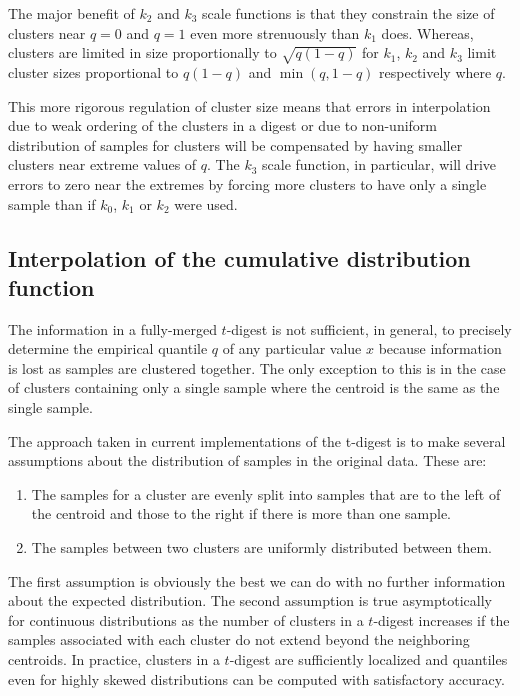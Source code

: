 \documentclass[11pt]{amsart}
\begin{document}
The major benefit of $k_2$ and $k_3$ scale functions is that they constrain the size of clusters near $q=0$ and $q=1$ even more strenuously than $k_1$ does. Whereas, clusters are limited in size proportionally to $\sqrt {q (1-q)}$ for $k_1$, $k_2$ and $k_3$ limit cluster sizes proportional to $q(1-q)$ and $\min(q,1-q)$ respectively where $q$.

This more rigorous regulation of cluster size means that errors in interpolation due to weak ordering of the clusters in a digest or due to non-uniform distribution of samples for clusters will be compensated by having smaller clusters near extreme values of $q$. The $k_3$ scale function, in particular, will drive errors to zero near the extremes by forcing more clusters to have only a single sample than if $k_0$, $k_1$ or $k_2$ were used.

\subsection{Interpolation of the cumulative distribution function}
The information in a fully-merged $t$-digest is not sufficient, in general, to precisely determine the empirical quantile $q$ of any particular value $x$ because information is lost as samples are clustered together. The only exception to this is in the case of clusters containing only a single sample where the centroid is the same as the single sample.

The approach taken in current implementations of the t-digest is to make several assumptions about the distribution of samples in the original data. These are:
\begin{enumerate}
\item The samples for a cluster are evenly split into samples that are to the left of the centroid and those to the right if there is more than one sample. 
\item The samples between two clusters are uniformly distributed between them. 
\end{enumerate}
The first assumption is obviously the best we can do with no further information about the expected distribution. The second assumption is true asymptotically for continuous distributions as the number of clusters in a $t$-digest increases if the samples associated with each cluster do not extend beyond the neighboring centroids. In practice, clusters in a $t$-digest are sufficiently localized and quantiles even for highly skewed distributions can be computed with satisfactory accuracy.
\end{document}
